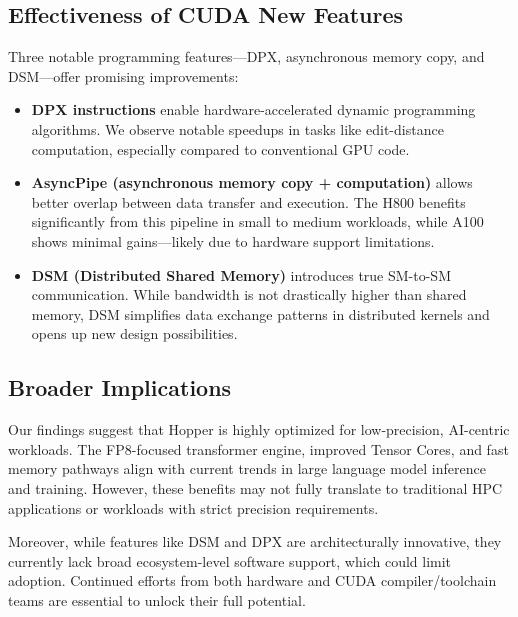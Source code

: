 \subsection{Effectiveness of CUDA New Features}

Three notable programming features—DPX, asynchronous memory copy, and DSM—offer promising improvements:

\begin{itemize}
    \item \textbf{DPX instructions} enable hardware-accelerated dynamic programming algorithms. We observe notable speedups in tasks like edit-distance computation, especially compared to conventional GPU code.
    \item \textbf{AsyncPipe (asynchronous memory copy + computation)} allows better overlap between data transfer and execution. The H800 benefits significantly from this pipeline in small to medium workloads, while A100 shows minimal gains—likely due to hardware support limitations.
    \item \textbf{DSM (Distributed Shared Memory)} introduces true SM-to-SM communication. While bandwidth is not drastically higher than shared memory, DSM simplifies data exchange patterns in distributed kernels and opens up new design possibilities.
\end{itemize}

\subsection{Broader Implications}

Our findings suggest that Hopper is highly optimized for low-precision, AI-centric workloads. The FP8-focused transformer engine, improved Tensor Cores\cite{nvidia2023te}, and fast memory pathways align with current trends in large language model inference and training. However, these benefits may not fully translate to traditional HPC applications or workloads with strict precision requirements.

Moreover, while features like DSM and DPX are architecturally innovative, they currently lack broad ecosystem-level software support, which could limit adoption. Continued efforts from both hardware and CUDA compiler/toolchain teams are essential to unlock their full potential.

